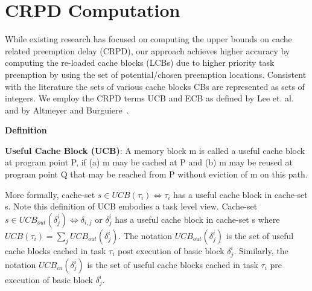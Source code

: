 \section{CRPD Computation}\label{sec:crpd_computation}

While existing research has focused on computing the upper bounds on cache related preemption delay (CRPD), our approach achieves higher accuracy by computing the re-loaded cache blocks (LCBs) due to higher priority task preemption by using the set of potential/chosen preemption locations.  Consistent with the literature the sets of various cache blocks CBs are represented as sets of integers.  We employ the CRPD terms UCB and ECB as defined by Lee et. al.~\cite{lee:98} and by Altmeyer and Burguiere~\cite{altmeyer:11c}.

\textbf{Definition~\cite{altmeyer:11c}}

\textbf{Useful Cache Block (UCB)}: A memory block m is called a useful cache block at program point P, if (a) m may be cached at P and (b) m may be reused at program point Q that may be reached from P without eviction of m on this path.

More formally, cache-set \begin{math}s \in UCB(\tau_{i}) \Leftrightarrow \tau_{i}\end{math} has a useful cache block in cache-set s.  Note this definition of UCB embodies a task level view.  Cache-set \begin{math}s \in UCB_{out}(\delta_{j}^{i}) \Leftrightarrow \delta_{i,j}\end{math} or \begin{math}\delta_{j}^{i}\end{math} has a useful cache block in cache-set s where \begin{math}UCB(\tau_{i}) = \sum_{j} UCB_{out}(\delta_{j}^{i})\end{math}. The notation \begin{math}UCB_{out}(\delta_{j}^{i})\end{math} is the set of useful cache blocks cached in task \begin{math}\tau_{i}\end{math} post execution of basic block \begin{math}\delta_{j}^{i}\end{math}.  Similarly, the notation \begin{math}UCB_{in}(\delta_{j}^{i})\end{math} is the set of useful cache blocks cached in task \begin{math}\tau_{i}\end{math} pre execution of basic block \begin{math}\delta_{j}^{i}\end{math}. 

